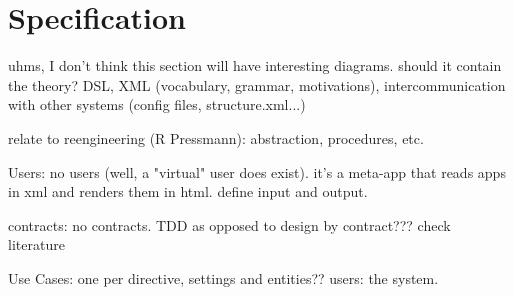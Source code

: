 \chapter{Specification}
uhms, I don't think this section will have interesting diagrams.
should it contain the theory? DSL, XML (vocabulary, grammar, motivations), intercommunication with other systems (config files, structure.xml...)

relate to reengineering (R Pressmann): abstraction, procedures, etc.

Users: no users (well, a "virtual" user does exist). it's a meta-app that reads apps in xml and renders them in html. define input and output.

contracts: no contracts. TDD as opposed to design by contract??? check literature

Use Cases: one per directive, settings and entities?? users: the system.
